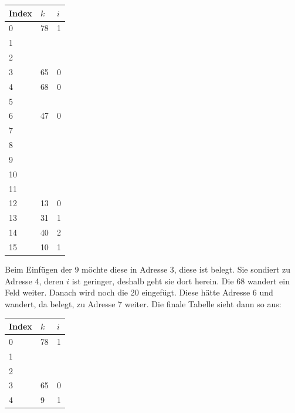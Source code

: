 \documentclass{scrartcl} %
\begin{document}
\begin{aufgabe}
\begin{enumerate}[label=(\alph*)]
            \begin{center}
                \begin{tabular}{|m{2cm}|m{1cm}<{\centering}|m{1cm}<{\centering}|}
                \hline
                     \rowcolor{teal!60} Index & $k$& $i$\\\hline
                     0 & 78 & 1\\
                     1 & & \\
                     2 & & \\
                     3 & 65 & 0\\
                     4 & 68 & 0\\
                     5 & & \\
                     6 & 47 & 0\\
                     7 & & \\
                     8 & & \\
                     9 & & \\
                     10 & & \\
                     11 & & \\
                     12 & 13 & 0\\
                     13 & 31 & 1\\
                     14 & 40 & 2\\
                     15 & 10 & 1\\\hline 
                \end{tabular}
            \end{center}
            Beim Einfügen der $9$ möchte diese in Adresse 3, diese ist belegt. Sie sondiert zu Adresse 4, deren $i$ ist geringer, deshalb geht sie dort herein. Die 68 wandert ein Feld weiter. Danach wird noch die 20 eingefügt. Diese hätte Adresse 6 und wandert, da belegt, zu Adresse 7 weiter. Die finale Tabelle sieht dann so aus:
            \begin{center}
                \begin{tabular}{|m{2cm}|m{1cm}<{\centering}|m{1cm}<{\centering}|}
                \hline
                     \rowcolor{teal!60} Index & $k$& $i$\\\hline
                     0 & 78 & 1\\
                     1 & & \\
                     2 & & \\
                     3 & 65 & 0\\
                     4 & 9 & 1\\

\end{tabular}
\end{center}
\end{enumerate}
\end{aufgabe}
\end{document}
